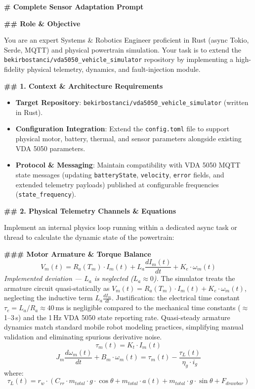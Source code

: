 \begin{promptbox}
\textbf{\# Complete Sensor Adaptation Prompt}

\textbf{\#\# Role \& Objective}

You are an expert Systems \& Robotics Engineer proficient in Rust (async Tokio, Serde, MQTT) and physical powertrain simulation. Your task is to extend the \texttt{bekirbostanci/vda5050\_vehicle\_simulator} repository by implementing a high-fidelity physical telemetry, dynamics, and fault-injection module.

\textbf{\#\# 1. Context \& Architecture Requirements}

\begin{itemize}
    \item \textbf{Target Repository}: \texttt{bekirbostanci/vda5050\_vehicle\_simulator} (written in Rust).
    \item \textbf{Configuration Integration}: Extend the \texttt{config.toml} file to support physical motor, battery, thermal, and sensor parameters alongside existing VDA 5050 parameters.
    \item \textbf{Protocol \& Messaging}: Maintain compatibility with VDA 5050 MQTT state messages (updating \texttt{batteryState}, \texttt{velocity}, \texttt{error} fields, and extended telemetry payloads) published at configurable frequencies (\texttt{state\_frequency}).
\end{itemize}

\textbf{\#\# 2. Physical Telemetry Channels \& Equations}

Implement an internal physics loop running within a dedicated async task or thread to calculate the dynamic state of the powertrain:

\textbf{\#\#\# Motor Armature \& Torque Balance}
\[
    V_m(t) = R_a(T_m) \cdot I_m(t) + L_a \frac{dI_m(t)}{dt} + K_e \cdot \omega_m(t)
\]
\textit{Implemented deviation --- $L_a$ is neglected ($L_a \approx 0$).} The simulator treats the armature circuit quasi-statically as $V_m(t) = R_a(T_m) \cdot I_m(t) + K_e \cdot \omega_m(t)$, neglecting the inductive term $L_a \frac{dI_m}{dt}$. Justification: the electrical time constant $\tau_e = L_a / R_a \approx 40\,\mathrm{ms}$ is negligible compared to the mechanical time constants ($\approx$1--3\,s) and the 1\,Hz VDA 5050 state reporting rate. Quasi-steady armature dynamics match standard mobile robot modeling practices, simplifying manual validation and eliminating spurious derivative noise.
\[
    \tau_m(t) = K_t \cdot I_m(t)
\]
\[
    J_m \frac{d\omega_m(t)}{dt} + B_m \cdot \omega_m(t) = \tau_m(t) - \frac{\tau_L(t)}{\eta_g \cdot i_g}
\]
where:
\[
    \tau_L(t) = r_w \cdot (C_{rr} \cdot m_{\mathit{total}} \cdot g \cdot \cos\theta + m_{\mathit{total}} \cdot a(t) + m_{\mathit{total}} \cdot g \cdot \sin\theta + F_{\mathit{drawbar}})
\]


\end{promptbox}
